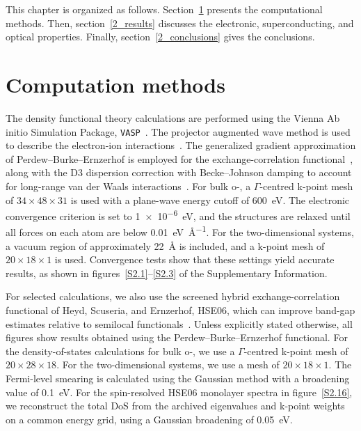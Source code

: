 This chapter is organized as follows.
Section~\ref{2_methods} presents the computational methods.
Then, section~\ref{2_results} discusses the electronic, superconducting, and optical properties.
Finally, section~\ref{2_conclusions} gives the conclusions.

\FloatBarrier
\section{Computation methods}
\label{2_methods}

The density functional theory calculations are performed using the Vienna Ab initio Simulation Package, \texttt{VASP}~\cite{kresse1993ab,kresse1994ab,kresse1996efficiency,kresse1996efficient}.
The projector augmented wave method is used to describe the electron-ion interactions~\cite{kresse1999ultrasoft}.
The generalized gradient approximation of Perdew--Burke--Ernzerhof is employed for the exchange-correlation functional~\cite{perdew1996generalized},
along with the D3 dispersion correction with Becke--Johnson damping to account for long-range van der Waals interactions~\cite{becke2005density,grimme2010consistent,grimme2011effect}.
For bulk o-, a $\Gamma$-centred k-point mesh of $34 \times 48 \times 31$ is used with a plane-wave energy cutoff of \qty{600}{\electronvolt}.
The electronic convergence criterion is set to \qty{1e-6}{\electronvolt},
and the structures are relaxed until all forces on each atom are below \qty{0.01}{\electronvolt\per\angstrom}.
For the two-dimensional systems, a vacuum region of approximately \qty{22}{\angstrom} is included,
and a k-point mesh of $20 \times 18 \times 1$ is used.
Convergence tests show that these settings yield accurate results,
as shown in figures~\ref{S2.1}--\ref{S2.3} of the Supplementary Information.

For selected calculations,
we also use the screened hybrid exchange-correlation functional of Heyd, Scuseria, and Ernzerhof, HSE06,
which can improve band-gap estimates relative to semilocal functionals~\cite{sassnick2021electronic,krukau2006influence}.
Unless explicitly stated otherwise,
all figures show results obtained using the Perdew--Burke--Ernzerhof functional.
For the density-of-states calculations for bulk o-,
we use a $\Gamma$-centred k-point mesh of $20 \times 28 \times 18$.
For the two-dimensional systems,
we use a mesh of $20 \times 18 \times 1$.
The Fermi-level smearing is calculated using the Gaussian method with a broadening value of \qty{0.1}{\electronvolt}.
For the spin-resolved HSE06 monolayer spectra in figure~\ref{S2.16},
we reconstruct the total DoS from the archived eigenvalues and k-point weights on a common energy grid,
using a Gaussian broadening of \qty{0.05}{\electronvolt}.

